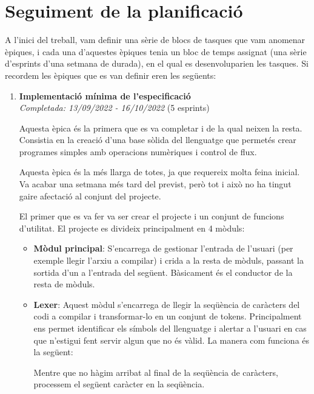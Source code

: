 ﻿\documentclass{article}
\begin{document}
\section{Seguiment de la planificació}
A l'inici del treball, vam definir una sèrie de blocs de tasques que vam anomenar
èpiques, i cada una d'aquestes èpiques tenia un bloc de temps assignat (una sèrie
d'esprints d'una setmana de durada), en el qual es desenvoluparien les tasques. 
Si recordem les èpiques que es van definir eren les següents:

\begin{enumerate}
    \item \textbf{Implementació mínima de l'especificació}\\
        \textit{Completada: 13/09/2022 - 16/10/2022} (5 esprints)

        Aquesta èpica és la primera que es va completar i de la qual neixen la 
        resta. Consistia en la creació d'una base sòlida del llenguatge que 
        permetés crear programes simples amb operacions numèriques i control
        de flux.

        Aquesta èpica és la més llarga de totes, ja que requereix molta feina
        inicial. Va acabar una setmana més tard del previst, però tot i això no
        ha tingut gaire afectació al conjunt del projecte.

        El primer que es va fer va ser crear el projecte i un conjunt de funcions
        d'utilitat. El projecte es divideix principalment en 4 mòduls:

        \begin{itemize}
            \item  
                \textbf{Mòdul principal}: S'encarrega de gestionar l'entrada de l'usuari
                (per exemple llegir l'arxiu a compilar) i crida a la resta de mòduls, passant
                la  sortida d'un a l'entrada del següent. Bàsicament és el conductor de
                la resta de mòduls.

            \item
                \textbf{Lexer}: Aquest mòdul s'encarrega de llegir la seqüència de
                caràcters del codi a compilar i transformar-lo en un conjunt de
                tokens. Principalment ens permet identificar els símbols del 
                llenguatge i alertar a l'usuari en cas que n'estigui fent servir
                algun que no és vàlid. La manera com funciona és la següent:

                Mentre que no hàgim arribat al final de la seqüència de caràcters,
                processem el següent caràcter en la seqüència. 


\end{itemize}
\end{enumerate}
\end{document}
